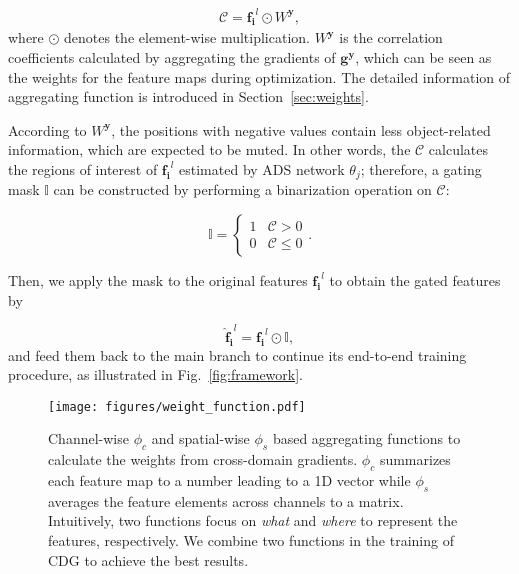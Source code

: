 \begin{eqnarray}
  \label{eqn:cross_domain_mapping}
  \mathcal{C} = \mathbf{f_{i}}^l\odot W^\mathbf{y},
\end{eqnarray}
where $\odot$ denotes the element-wise multiplication. $W^\mathbf{y}$ is the correlation coefficients calculated by aggregating the gradients of $\mathbf{g^{\mathbf{y}}}$, which can be seen as the weights for the feature maps during optimization. The detailed information of aggregating function is introduced in Section~\ref{sec:weights}.

According to $W^\mathbf{y}$, the positions with negative values contain less object-related information, which are expected to be muted. In other words, the $\mathcal{C}$ calculates the regions of interest of $\mathbf{f_{i}}^l$ estimated by ADS network $\theta_j$; therefore, a gating mask $\mathbb{I}$ can be constructed by performing a binarization operation on $\mathcal{C}$:


\begin{equation}
  \label{eqn:mask}
  \mathbb{I} =
  \begin{cases}
    1 & \mathcal{C}>0     \\
    0 & \mathcal{C}\leq 0
  \end{cases}.
\end{equation}

Then, we apply the mask to the original features $\mathbf{f_{i}}^l$ to obtain the gated features by

\begin{equation}
  \label{eqn:gated}
  \mathbf{\hat{f}_{i}}^l = \mathbf{f_{i}}^l \odot \mathbb{I},
\end{equation}
and feed them back to the main branch to continue its end-to-end training procedure, as illustrated in Fig.~\ref{fig:framework}.


\begin{figure}[tb]
  \centering
  \texttt{[image: figures/weight\_function.pdf]}
  \caption{Channel-wise $\phi_c$ and spatial-wise $\phi_s$ based aggregating functions to calculate the weights from cross-domain gradients. $\phi_c$ summarizes each feature map to a number leading to a 1D vector while $\phi_s$ averages the feature elements across channels to a matrix. Intuitively, two functions focus on \textit{what} and \textit{where} to represent the features, respectively. We combine two functions in the training of CDG to achieve the best results.}
  \label{fig:weight}
\end{figure}

